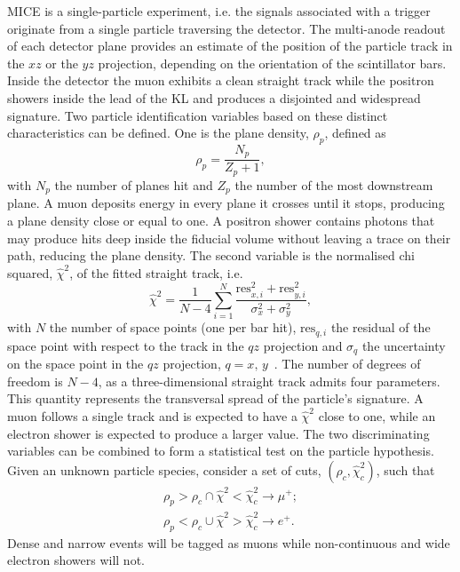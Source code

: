 MICE is a single-particle experiment, i.e. the signals associated with a trigger originate from a single particle traversing the detector. The multi-anode readout of each detector plane provides an estimate of the position of the particle track in the $xz$ or the $yz$ projection, depending on the orientation of the scintillator bars.
Inside the detector the muon exhibits a clean straight track while the positron showers inside the lead of the KL and produces a disjointed and widespread signature. 
Two particle identification variables based on these distinct characteristics can be defined. One is the plane density, $\rho_p$, defined as
\begin{equation}
\rho_p = \frac{N_p}{Z_p+1},
\end{equation}
with $N_p$ the number of planes hit and $Z_p$ the number of the most downstream plane. A muon deposits energy in every plane it crosses until it stops, producing a plane density close or equal to one. A positron shower contains photons that may produce hits deep inside the fiducial volume without leaving a trace on their path, reducing the plane density. The second variable is the normalised chi squared, $\hat{\chi}^2$, of the fitted straight track, i.e.
\begin{equation}
\hat{\chi}^2=\frac{1}{N-4}\sum_{i=1}^{N}\frac{\text{res}_{x,i}^2+\text{res}_{y,i}^2}{\sigma_x^2+\sigma_y^2},
\end{equation}
with $N$ the number of space points (one per bar hit), $\text{res}_{q,i}$ the residual of the space point with respect to the track in the $qz$ projection and $\sigma_q$ the uncertainty on the space point in the $qz$ projection, $q=x,\,y$~\cite{Drielsma:thesis}. The number of degrees of freedom is $N-4$, as a three-dimensional straight track admits four parameters. This quantity represents the transversal spread of the particle's signature. A muon follows a single track and is expected to have a $\hat{\chi}^2$ close to one, while an electron shower is expected to produce a larger value.
The two discriminating variables can be combined to form a statistical test on the particle hypothesis. Given an unknown particle species, consider a set of cuts, $(\rho_c,\hat{\chi}^2_c)$, such that
\begin{equation}
\begin{gathered}
\rho_p>\rho_c \cap \hat{\chi}^2<\hat{\chi}^2_c  \rightarrow  \mu^+; \\
\rho_p<\rho_c \cup \hat{\chi}^2>\hat{\chi}^2_c \rightarrow  e^+.
\end{gathered}
\end{equation}
Dense and narrow events will be tagged as muons while non-continuous and wide electron showers will not. 

